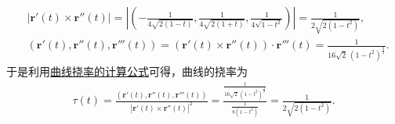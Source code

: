 \documentclass[../../main.tex]{subfiles}%
\begin{document}
\begin{solution}
\begin{align*}
&\left| \boldsymbol{r}' \left( t \right) \times \boldsymbol{r}'' \left( t \right) \right|=\left| \left( -\frac{1}{4\sqrt{2\left( 1-t \right)}},\frac{1}{4\sqrt{2\left( 1+t \right)}},\frac{1}{4\sqrt{1-t^2}} \right) \right|=\frac{1}{2\sqrt{2\left( 1-t^2 \right)}},
\\
&\left( \boldsymbol{r}' \left( t \right) ,\boldsymbol{r}'' \left( t \right) ,\boldsymbol{r}''' \left( t \right) \right) =\left( \boldsymbol{r}' \left( t \right) \times \boldsymbol{r}'' \left( t \right) \right) \cdot \boldsymbol{r}''' \left( t \right) =\frac{1}{16\sqrt{2}\,\left( 1-t^2 \right) ^{\frac{3}{2}}}.
\end{align*}
于是利用\hyperref[theorem:微分几何-曲线挠率的计算公式]{曲线挠率的计算公式}可得，曲线的挠率为
\begin{align*}
\tau \left( t \right) =\frac{\left( \boldsymbol{r}' \left( t \right) ,\boldsymbol{r}'' \left( t \right) ,\boldsymbol{r}''' \left( t \right) \right)}{\left| \boldsymbol{r}' \left( t \right) \times \boldsymbol{r}'' \left( t \right) \right|^2}=\frac{\frac{1}{16\sqrt{2}\,\left( 1-t^2 \right) ^{\frac{3}{2}}}}{\frac{1}{8\left( 1-t^2 \right)}}=\frac{1}{2\sqrt{2\left( 1-t^2 \right)}}.
\end{align*}

\end{solution}
\end{document}
